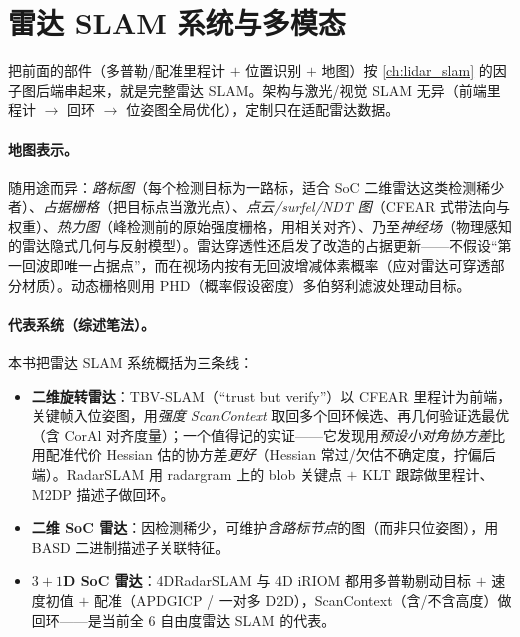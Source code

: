\section{雷达 SLAM 系统与多模态}
\label{sec:radar-slam}

把前面的部件（多普勒/配准里程计 $+$ 位置识别 $+$ 地图）按 \cref{ch:lidar_slam} 的因子图后端串起来，就是完整雷达 SLAM。架构与激光/视觉 SLAM 无异（前端里程计 $\to$ 回环 $\to$ 位姿图全局优化），定制只在适配雷达数据。

\paragraph{地图表示。}
随用途而异\cite{carlone2026handbook}：\emph{路标图}（每个检测目标为一路标，适合 SoC 二维雷达这类检测稀少者）、\emph{占据栅格}（把目标点当激光点）、\emph{点云/surfel/NDT 图}（CFEAR 式带法向与权重）、\emph{热力图}（峰检测前的原始强度栅格，用相关对齐）、乃至\emph{神经场}（物理感知的雷达隐式几何与反射模型）。雷达穿透性还启发了改造的占据更新——不假设“第一回波即唯一占据点”，而在视场内按有无回波增减体素概率（应对雷达可穿透部分材质）。动态栅格则用 PHD（概率假设密度）多伯努利滤波处理动目标。

\paragraph{代表系统（综述笔法）。}
本书把雷达 SLAM 系统概括为三条线\cite{carlone2026handbook}：
\begin{itemize}
  \item \textbf{二维旋转雷达}：TBV-SLAM（“trust but verify”）以 CFEAR 里程计为前端，关键帧入位姿图，用\emph{强度 ScanContext} 取回多个回环候选、再几何验证选最优（含 CorAl 对齐度量）；一个值得记的实证——它发现用\emph{预设小对角协方差}比用配准代价 Hessian 估的协方差\emph{更好}（Hessian 常过/欠估不确定度，拧偏后端）。RadarSLAM 用 radargram 上的 blob 关键点 $+$ KLT 跟踪做里程计、M2DP 描述子做回环。
  \item \textbf{二维 SoC 雷达}：因检测稀少，可维护\emph{含路标节点}的图（而非只位姿图），用 BASD 二进制描述子关联特征。
  \item \textbf{$3{+}1$D SoC 雷达}：4DRadarSLAM 与 4D iRIOM 都用多普勒剔动目标 $+$ 速度初值 $+$ 配准（APDGICP / 一对多 D2D），ScanContext（含/不含高度）做回环——是当前全 $6$ 自由度雷达 SLAM 的代表。
\end{itemize}


